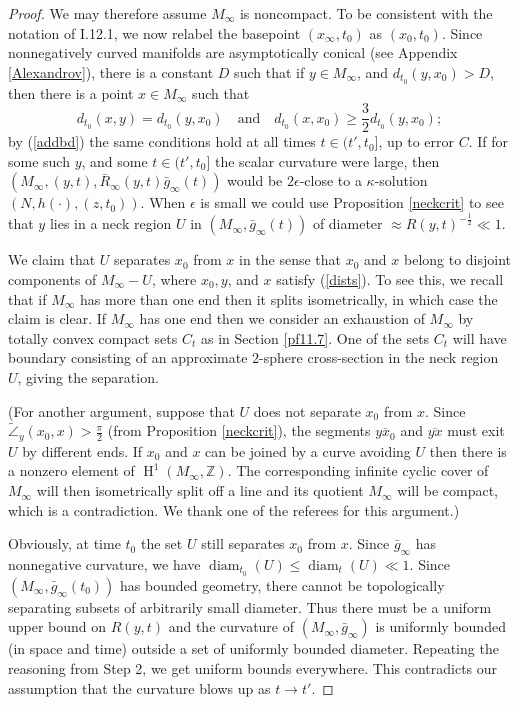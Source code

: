 \documentclass[12pt]{amsart}
\newcommand{\diam}{\operatorname{diam}}
\newcommand{\HH}{\operatorname{H}}
\newcommand{\Z}{{\mathbb Z}}
\newcommand{\cangle}{\widetilde{\angle}}
\newcommand{\eps}{\epsilon}
\newcommand{\ra}{\rightarrow}
\numberwithin{equation}{section}
\theoremstyle{plain}
\theoremstyle{definition}
\theoremstyle{remark}
\begin{document}
\begin{proof}
We may therefore assume $M_\infty$ is noncompact.
To be consistent with the notation of I.12.1, we now relabel
the basepoint $(x_\infty, t_0)$ as $(x_0, t_0)$.  Since
nonnegatively curved manifolds are asymptotically conical
(see Appendix \ref{Alexandrov}),
there is a constant $D$ such that if $y\in M_\infty$,
and $d_{t_0}(y,x_0)>D$, then there is a point $x\in M_\infty$
such that
\begin{equation}
\label{dists}
d_{t_0}(x,y)=d_{t_0}(y,x_0)\quad \mbox{and} 
\quad d_{t_0}(x,x_0)\geq \frac{3}{2}d_{t_0}(y,x_0);
\end{equation} 
by (\ref{addbd})
the same conditions hold at all times $t\in(t',t_0]$, up to error
$C$.   If for some such $y$, and some $t\in (t',t_0]$ the scalar
curvature were large, then $(M_\infty,(y,t),\bar R_\infty(y,t)\bar 
g_\infty(t))$
would be $2\eps$-close to a $\kappa$-solution $(N,h(\cdot),(z,t_0))$.  When
$\eps$ is small we could  use Proposition \ref{neckcrit} to 
see that $y$ lies in a neck region $U$ in $(M_\infty,\bar g_\infty(t))$ 
of diameter $\approx R(y,t)^{-\frac{1}{2}}\ll 1$.

We claim that $U$ separates
$x_0$ from $x$ in the sense that $x_0$ and $x$ belong
to disjoint components of $M_\infty - U$, where $x_0, y$, and $x$
satisfy (\ref{dists}).
To see this, we
recall that if $M_\infty$ has more than one end then it splits
isometrically, in which case the claim is clear. If $M_\infty$ has
one end then we consider an exhaustion of $M_\infty$ by totally
convex compact sets $C_t$ as in Section \ref{pf11.7}. One of the
sets $C_t$ will have boundary consisting of an approximate $2$-sphere
cross-section in the neck region $U$, giving the separation.

(For another argument, suppose that $U$ does not separate $x_0$ from 
$x$. Since $\cangle_y(x_0, x) > \frac{\pi}{2}$ (from Proposition \ref{neckcrit}),
the segments $\overline{yx_0}$ and $\overline{yx}$ must exit $U$ by
different ends.  If $x_0$ and $x$ can be joined by a curve avoiding $U$
then there is a nonzero element of
$\HH^1(M_\infty, \Z)$. The corresponding infinite cyclic cover of $M_\infty$ will then
isometrically split off a line and its quotient $M_\infty$ will be
compact, which is a contradiction.  We thank one of the referees for
this argument.)

Obviously, at time $t_0$ the set
$U$ still separates $x_0$ from $x$. 
Since $\bar g_\infty$ has nonnegative curvature,
we have $\diam_{t_0}(U)\leq \diam_t(U)\ll 1$. 
Since $(M_\infty,\bar g_\infty({t_0}))$ has bounded geometry,
there cannot be topologically separating subsets of arbitrarily small
diameter. 
Thus there must be a uniform upper bound on $R(y, t)$
and the curvature of $(M_\infty,\bar g_\infty)$ is uniformly bounded
(in space and time)
outside a set of uniformly bounded diameter.  Repeating the reasoning
from Step 2, we get uniform bounds everywhere.  This contradicts
our assumption that the curvature blows up as $t\ra t'$.


\end{proof}
\end{document}
